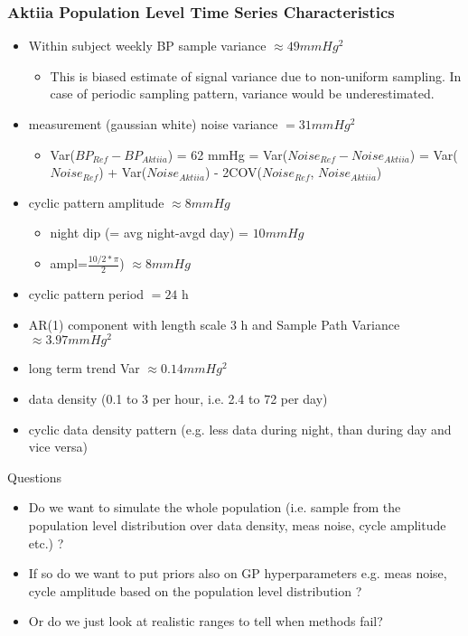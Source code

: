 \documentclass[
	8pt, %
]{beamer}
\begin{document}
\begin{frame}
	\frametitle{Aktiia Population Level Time Series Characteristics}

	\begin{itemize}
		\item Within subject weekly BP sample variance $\approx 49 mmHg^2$
		\begin{itemize}
			\item This is biased estimate of signal variance due to non-uniform sampling. In case
			of periodic sampling pattern, variance would be underestimated.
		\end{itemize}
		\item measurement (gaussian white) noise variance $=31 mmHg^2$
		\begin{itemize}
			\item Var($BP_{Ref} - BP_{Aktiia}$) = 62 mmHg = Var($Noise_{Ref} - Noise_{Aktiia}$) = Var($Noise_{Ref}$) + Var($Noise_{Aktiia}$) - 2COV($Noise_{Ref}$,
			$Noise_{Aktiia}$)
		\end{itemize}
		\item cyclic pattern amplitude $\approx 8 mmHg$
		\begin{itemize}
			\item night dip (= avg night-avgd day) = $10 mmHg$
			\item ampl=$\frac{10/2 *\pi}{2}$) $\approx 8 mmHg$
		\end{itemize}
		\item cyclic pattern period $= 24$ h
		\item AR(1) component with length scale 3 h and Sample Path Variance $\approx 3.97 mmHg^2$
		\item long term trend Var $\approx 0.14 mmHg^2$
		\item data density (0.1 to 3 per hour, i.e. 2.4 to 72 per day)
		\item cyclic data density pattern (e.g. less data during night, than during day and vice versa)
	\end{itemize}

	\begin{block}{Questions}
		\begin{itemize}
			\item Do we want to simulate the whole population (i.e. sample from the population level distribution
		over data density, meas noise, cycle amplitude etc.) ?
			\item If so do we want to put priors also on GP hyperparameters e.g. meas noise, cycle amplitude based on
		the population level distribution ?
			\item Or do we just look at realistic ranges to tell when methods fail?
		\end{itemize}
	\end{block}


\end{frame}
\end{document}
